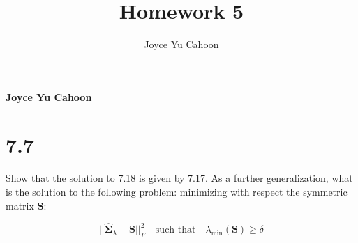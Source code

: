 \documentclass[11pt,]{article}
\title{Homework 5  }
\author{\Large Joyce Yu Cahoon\vspace{0.05in} \newline\normalsize\emph{}  }
\date{}
\newcommand*{\authorfont}{\fontfamily{phv}\selectfont}
\begin{document}
%

{%
\setlength{\parindent}{0pt}
\thispagestyle{plain}
{\fontsize{18}{20}\selectfont\raggedright 
\maketitle  %

}

{
  \vskip 13.5pt\relax \normalsize\fontsize{11}{12} 
  \textbf{\authorfont Joyce Yu Cahoon} \hskip 15pt \emph{\small }   
  
}

}






\vskip 6.5pt


\noindent  \hypertarget{section}{%
\section{7.7}\label{section}}

Show that the solution to 7.18 is given by 7.17. As a further
generalization, what is the solution to the following problem:
minimizing with respect the symmetric matrix \({\bm{{S}}}\):

\[
||\hat{{\bm{{\Sigma}}}}_{\lambda} - {\bm{{S}}}||^2_{F} \quad \text{such that} \quad \lambda_{\min}({\bm{{S}}}) \geq \delta
\]
\end{document}
